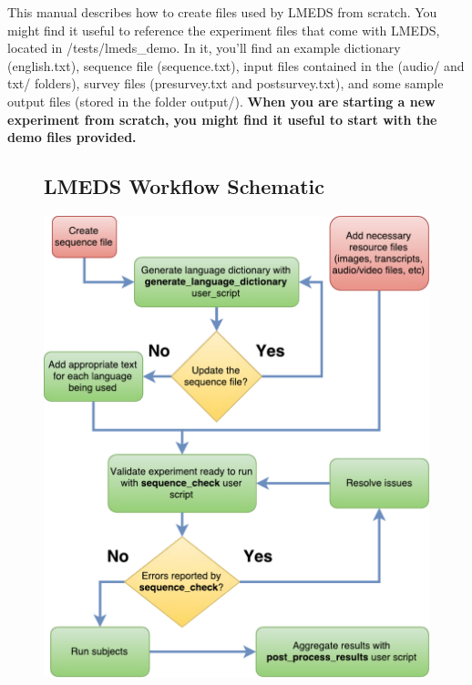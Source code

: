 This manual describes how to create files used by LMEDS from scratch.  You might find it useful to reference the experiment files that come with LMEDS, located in /tests/lmeds\_demo.  In it, you'll find an example dictionary (english.txt), sequence file (sequence.txt), input files contained in the (audio/ and txt/ folders), survey files (presurvey.txt and postsurvey.txt), and some sample output files (stored in the folder output/).
\textbf{When you are starting a new experiment from scratch, you might find it useful to start with the demo files provided.}

\begin{figure}
\subsection{LMEDS Workflow Schematic}
\centering
\includegraphics[height=0.95\textheight]{lmedsSchematic.pdf}
\end{figure}


\paragraph{}


